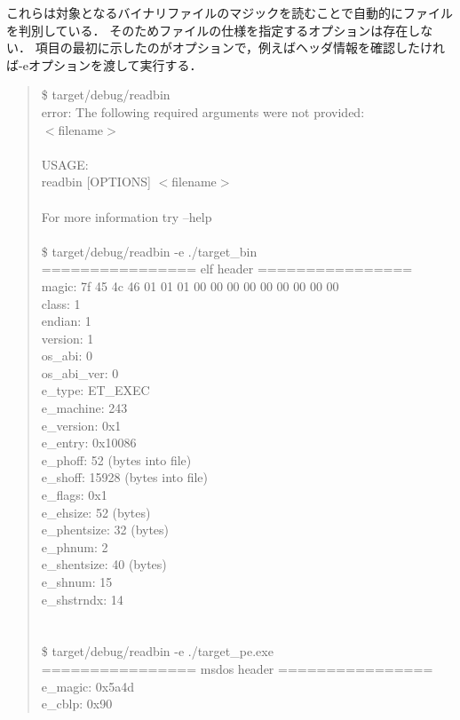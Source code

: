 \documentclass[12pt,a4paper,dvipdfmx]{jsarticle}
\begin{document}
これらは対象となるバイナリファイルのマジックを読むことで自動的にファイルを判別している．
そのためファイルの仕様を指定するオプションは存在しない．
項目の最初に示したのがオプションで，例えばヘッダ情報を確認したければ-eオプションを渡して実行する．
\begin{quote}
\$ target/debug/readbin \\
error: The following required arguments were not provided: \\
    $<$filename$>$ \\
 \\
USAGE: \\
    readbin [OPTIONS] $<$filename$>$ \\
 \\
For more information try --help \\
 \\
\$ target/debug/readbin -e ./target\_bin \\
================ elf header ================ \\
magic:	7f 45 4c 46 01 01 01 00 00 00 00 00 00 00 00 00 \\
class:		1 \\
endian:		1 \\
version:	1 \\
os\_abi:		0 \\
os\_abi\_ver:	0 \\
e\_type:		ET\_EXEC \\
e\_machine:	243 \\
e\_version:	0x1 \\
e\_entry:	0x10086 \\
e\_phoff:	52 (bytes into file) \\
e\_shoff:	15928 (bytes into file) \\
e\_flags:	0x1 \\
e\_ehsize:	52 (bytes) \\
e\_phentsize:	32 (bytes) \\
e\_phnum:	2 \\
e\_shentsize:	40 (bytes) \\
e\_shnum:	15 \\
e\_shstrndx:	14 \\
 \\
 \\
\$ target/debug/readbin -e ./target\_pe.exe \\
================ msdos header ================ \\
e\_magic:	0x5a4d \\
e\_cblp:		0x90 \\

\end{quote}
\end{document}

